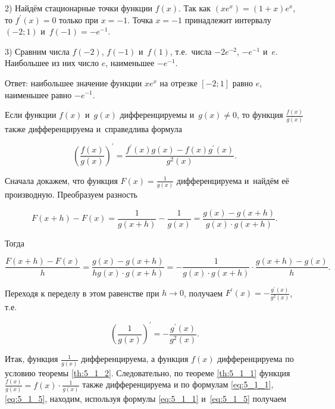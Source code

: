 2) Найдём стационарные точки функции $f(x)$. Так как $(xe^{x}) = (1+x)e^{x}$,
то $f^\prime (x) = 0$ только при $x = -1$.
Точка $x = -1$ принадлежит интервалу $(-2; 1)$ и~$f(-1) = -e^{-1}$.

3) Сравним числа $f(-2)$, $f(-1)$ и~$f(1)$, т.е.\ числа $-2e^{-2}$, $-e^{-1}$ и~$e$.
Наибольшее из них число $e$, наименьшее $-e^{-1}$.

Ответ: наибольшее значение функции $xe^{x}$ на отрезке $[-2; 1]$ равно $e$,
наименьшее равно $-e^{-1}$.

\begin{Th}\label{th:5_1_2}
Если функции $f(x)$ и~$g(x)$ дифференцируемы и~$g(x) \ne 0$,
то функция $\displaystyle \frac{f(x)}{g(x)}$ также дифференцируема
и~справедлива формула

\begin{equation}\label{eq:5_1_4}
\displaystyle 
\left(
\frac{f(x)}{g(x)}
\right)^\prime =
\frac{f^\prime(x)g(x) - f(x)g^\prime(x)}{g^{2}(x)}.
\end{equation}
\end{Th}

Сначала докажем, что функция $\displaystyle F(x) = \frac{1}{g(x)}$ дифференцируема
и~найдём её производную. Преобразуем разность

\begin{equation*}
F(x+h) - F(x) =
\frac{1}{g(x+h)} - \frac{1}{g(x)} =
\frac{g(x) - g(x+h)}{g(x) \cdot g(x+h)}.
\end{equation*}

\noindent
Тогда

\begin{equation*}
\displaystyle \frac{F(x+h) - F(x)}{h} =
\frac{g(x) - g(x+h)}{hg(x) \cdot g(x+h)} =
-\frac{1}{g(x) \cdot g(x+h)} \cdot \frac{g(x+h)- g(x)}{h}.
\end{equation*}

Переходя к переделу в этом равенстве при $h \to 0$, получаем
$\displaystyle F^\prime(x) = -\frac{g^\prime(x)}{g^{2}(x)}$, т.е.\

\begin{equation}\label{eq:5_1_5}
\displaystyle 
\left(
\frac{1}{g(x)}
\right)^\prime = 
-\frac{g^\prime(x)}{g^{2}(x)}.
\end{equation}

Итак, функция $\displaystyle \frac{1}{g(x)}$ дифференцируема,
а функция $f(x)$ дифференцируема по условию теоремы \ref{th:5_1_2}.
Следовательно, по теореме \ref{th:5_1_1}
функция $\displaystyle \frac{f(x)}{g(x)} = f(x) \cdot \frac{1}{g(x)}$
также дифференцируема и по формулам \eqref{eq:5_1_1}, \eqref{eq:5_1_5}, 
находим, используя формулы \eqref{eq:5_1_1} и~\eqref{eq:5_1_5} получаем

